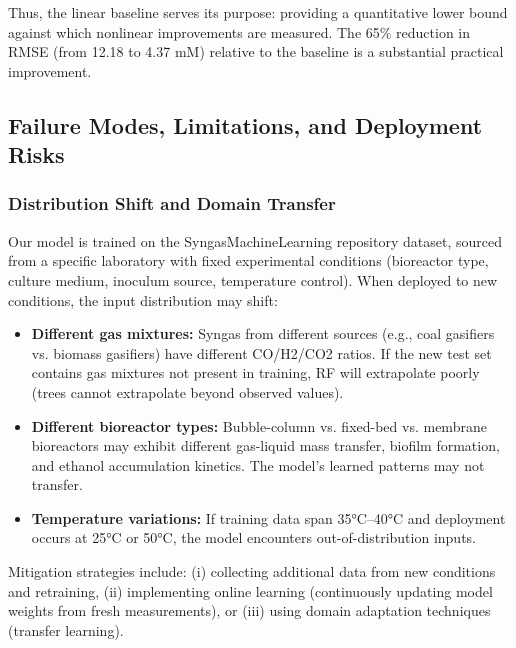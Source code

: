 \documentclass[conference]{IEEEtran}
\begin{document}
Thus, the linear baseline serves its purpose: providing a quantitative lower bound against which nonlinear improvements are measured. The 65\% reduction in RMSE (from 12.18 to 4.37 mM) relative to the baseline is a substantial practical improvement.

\subsection{Failure Modes, Limitations, and Deployment Risks}

\subsubsection{Distribution Shift and Domain Transfer}
Our model is trained on the SyngasMachineLearning repository dataset, sourced from a specific laboratory with fixed experimental conditions (bioreactor type, culture medium, inoculum source, temperature control). When deployed to new conditions, the input distribution may shift:

\begin{itemize}
\item \textbf{Different gas mixtures:} Syngas from different sources (e.g., coal gasifiers vs. biomass gasifiers) have different CO/H2/CO2 ratios. If the new test set contains gas mixtures not present in training, RF will extrapolate poorly (trees cannot extrapolate beyond observed values).
\item \textbf{Different bioreactor types:} Bubble-column vs. fixed-bed vs. membrane bioreactors may exhibit different gas-liquid mass transfer, biofilm formation, and ethanol accumulation kinetics. The model's learned patterns may not transfer.
\item \textbf{Temperature variations:} If training data span 35°C–40°C and deployment occurs at 25°C or 50°C, the model encounters out-of-distribution inputs.
\end{itemize}

Mitigation strategies include: (i) collecting additional data from new conditions and retraining, (ii) implementing online learning (continuously updating model weights from fresh measurements), or (iii) using domain adaptation techniques (transfer learning).
\end{document}
